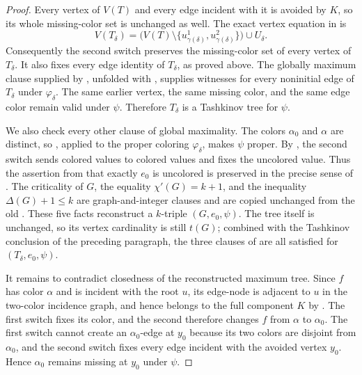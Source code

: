 \begin{proof}
Every vertex of $V(T)$ and every edge incident with it is avoided by
$K$, so its whole missing-color set is unchanged as well.  The exact
vertex equation in  is
\[
 V(T_\delta)=
 \bigl(V(T)\setminus
   \{u^1_{\gamma(\delta)},u^2_{\gamma(\delta)}\}\bigr)
 \cup U_\delta .
\]
Consequently the second switch preserves the missing-color set of every
vertex of $T_\delta$.  It also fixes every edge identity of $T_\delta$,
as proved above.  The globally maximum clause supplied by
, unfolded with
, supplies
 witnesses for every noninitial edge of
$T_\delta$ under $\varphi_\delta$.  The same earlier vertex, the same
missing color, and the same edge color remain valid under $\psi$.
Therefore $T_\delta$ is a Tashkinov tree for $\psi$.

We also check every other clause of global maximality.  The colors
$\alpha_0$ and $\alpha$ are distinct, so
, applied to the proper coloring
$\varphi_\delta$, makes $\psi$ proper.  By
, the second switch sends colored values
to colored values and fixes the uncolored value.  Thus the assertion from
 that exactly $e_0$ is uncolored is
preserved in the precise sense of .  The
criticality of $G$, the equality $\chi'(G)=k+1$, and the inequality
$\Delta(G)+1\leq k$ are graph-and-integer clauses and are copied unchanged
from the old .  These five facts reconstruct a
$k$-triple $(G,e_0,\psi)$.  The tree itself is unchanged, so its vertex
cardinality is still $t(G)$; combined with the Tashkinov conclusion of the
preceding paragraph, the three clauses of
 are all satisfied for
$(T_\delta,e_0,\psi)$.

It remains to contradict closedness of the reconstructed maximum tree.
Since
$f$ has color $\alpha$ and is incident with the root $u$, its edge-node is
adjacent to $u$ in the two-color incidence graph, and hence belongs to the
full component $K$ by .  The first switch fixes
its color, and the second therefore changes $f$ from $\alpha$ to
$\alpha_0$.  The first switch cannot create an $\alpha_0$-edge at $y_0$
because its two colors are disjoint from $\alpha_0$, and the second switch
fixes every edge incident with the avoided vertex $y_0$.  Hence
$\alpha_0$ remains missing at $y_0$ under $\psi$.


\end{proof}

